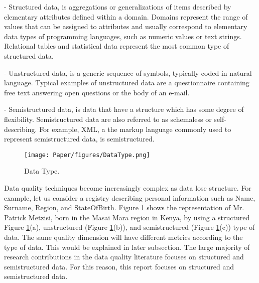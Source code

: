 \documentclass[pdftex,english,oribibl]{llncs}
\begin{document}
- Structured data, is aggregations or generalizations of items described by elementary attributes defined within a domain.
Domains represent the range of values that can be assigned to attributes and usually correspond to elementary data types of programming languages, such as numeric values or text strings.
Relational tables and statistical data represent the most common type of structured data.

- Unstructured data, is a generic sequence of symbols, typically coded in natural language.
Typical examples of unstructured data are a questionnaire containing free text answering open questions or the body of an e-mail.

- Semistructured data, is data that have a structure which has some degree of flexibility. Semistructured data are also referred to as schemaless or self-describing.
For example, XML, a the markup language commonly used to represent semistructured data, is semistructured.
\begin{comment}
Some common characteristics are:
(1) data can contain fields not known at design time; for instance, an XML file does not have an associated XML schema file;
(2) the same kind of data may be represented in multiple ways; for example, a date might be represented by one field or by multiple fields, even within a single data set; and
(3) among the fields known at design time, many fields will not have values.
\end{comment}

  \begin{figure}
    \centering
    \texttt{[image: Paper/figures/DataType.png]}
    \caption{Data Type.}
    \label{fig:datatype}
  \end{figure}

 Data quality techniques become increasingly complex as data lose structure. For example, let us consider a registry describing personal information such as Name, Surname, Region, and StateOfBirth. Figure \ref{fig:datatype} shows the representation of Mr. Patrick Metzisi, born in the Masai Mara region in Kenya, by using a structured Figure \ref{fig:datatype}(a), unstructured (Figure \ref{fig:datatype}(b)), and semistructured (Figure \ref{fig:datatype}(c)) type of data.
 The same quality dimension will have different metrics according to the type of data. This would be explained in later subsection.
 The large majority of research contributions in the data quality literature focuses on structured and semistructured data. For this reason, this report focuses on structured and semistructured data.
\end{document}
